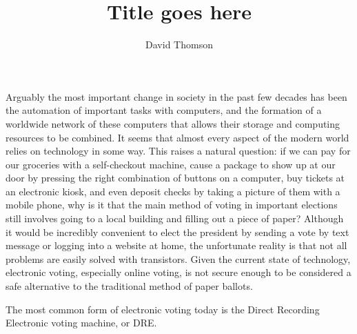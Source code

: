 \documentclass[12pt, titlepage]{article}
\begin{document}
\title{Title goes here}
\author{David Thomson}
\maketitle

Arguably the most important change in society in the past few decades has been the automation of important tasks with computers, and the formation of a worldwide network of these computers that allows their storage and computing resources to be combined. It seems that almost every aspect of the modern world relies on technology in some way. This raises a natural question: if we can pay for our groceries with a self-checkout machine, cause a package to show up at our door by pressing the right combination of buttons on a computer, buy tickets at an electronic kiosk, and even deposit checks by taking a picture of them with a mobile phone, why is it that the main method of voting in important elections still involves going to a local building and filling out a piece of paper? Although it would be incredibly convenient to elect the president by sending a vote by text message or logging into a website at home, the unfortunate reality is that not all problems are easily solved with transistors. Given the current state of technology, electronic voting, especially online voting, is not secure enough to be considered a safe alternative to the traditional method of paper ballots.

The most common form of electronic voting today is the Direct Recording Electronic voting machine, or DRE. 

\cite{VVPAT_Debunk}

\printbibliography
\end{document}
